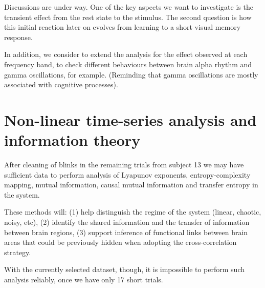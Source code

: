\documentclass[a4paper]{article}
\begin{document}
Discussions are under way. One of the key aspects we want to investigate is the transient effect from the rest state to the stimulus. The second question is how this initial reaction later on evolves from learning to a short visual memory response.

In addition, we consider to extend the analysis for the effect observed at each frequency band, to check different behaviours between brain alpha rhythm and gamma oscillations, for example. (Reminding that gamma oscillations are mostly associated with cognitive processes). 

\section{Non-linear time-series analysis and information theory}

After cleaning of blinks in the remaining trials from subject 13 we may have sufficient data to perform analysis of Lyapunov exponents, entropy-complexity mapping, mutual information, causal mutual information and transfer entropy in the system. 

These methods will: (1) help distinguish the regime of the system (linear, chaotic, noisy, etc), (2) identify the shared information and the transfer of information between brain regions, (3) support inference of functional links between brain areas that could be previously hidden when adopting the cross-correlation strategy. 

With the currently selected dataset, though, it is impossible to perform such analysis reliably, once we have only 17 short trials.



\end{document}
